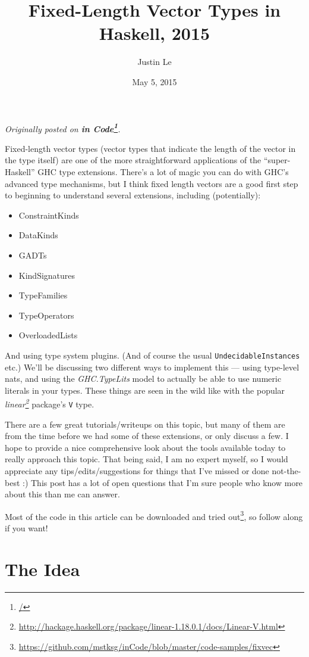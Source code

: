 \documentclass[]{article}
\title{Fixed-Length Vector Types in Haskell, 2015}
\author{Justin Le}
\date{May 5, 2015}
\renewcommand{\href}[2]{#2\footnote{\url{#1}}}
\begin{document}
\maketitle

\emph{Originally posted on \textbf{\href{/}{in Code}}.}

Fixed-length vector types (vector types that indicate the length of the
vector in the type itself) are one of the more straightforward
applications of the ``super-Haskell'' GHC type extensions. There's a lot
of magic you can do with GHC's advanced type mechanisms, but I think
fixed length vectors are a good first step to beginning to understand
several extensions, including (potentially):

\begin{itemize}
\tightlist
\item
  ConstraintKinds
\item
  DataKinds
\item
  GADTs
\item
  KindSignatures
\item
  TypeFamilies
\item
  TypeOperators
\item
  OverloadedLists
\end{itemize}

And using type system plugins. (And of course the usual
\texttt{UndecidableInstances} etc.) We'll be discussing two different
ways to implement this --- using type-level nats, and using the
\emph{GHC.TypeLits} model to actually be able to use numeric literals in
your types. These things are seen in the wild like with the popular
\emph{\href{http://hackage.haskell.org/package/linear-1.18.0.1/docs/Linear-V.html}{linear}}
package's \texttt{V} type.

There are a few great tutorials/writeups on this topic, but many of them
are from the time before we had some of these extensions, or only
discuss a few. I hope to provide a nice comprehensive look about the
tools available today to really approach this topic. That being said, I
am no expert myself, so I would appreciate any tips/edits/suggestions
for things that I've missed or done not-the-best :) This post has a lot
of open questions that I'm sure people who know more about this than me
can answer.

Most of the code in this article can be
\href{https://github.com/mstksg/inCode/blob/master/code-samples/fixvec}{downloaded
and tried out}, so follow along if you want!

\section{The Idea}\label{the-idea}
\end{document}
